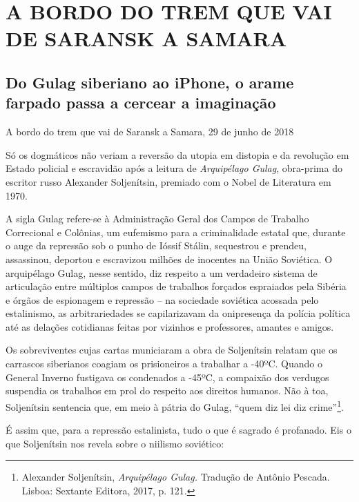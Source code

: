 \newpage
{}
\part*{A BORDO DO TREM QUE VAI DE SARANSK A SAMARA}

\chapter*{Do Gulag siberiano ao iPhone, o arame farpado passa a cercear a imaginação}

\begin{flushright}
A bordo do trem que vai de Saransk a Samara, 29 de junho de 2018
\end{flushright}

Só os dogmáticos não veriam a reversão da utopia em distopia e da
revolução em Estado policial e escravidão após a leitura de
\emph{Arquipélago Gulag}, obra-prima do escritor russo Alexander
Soljenítsin, premiado com o Nobel de Literatura em 1970.

A sigla Gulag refere-se à Administração Geral dos Campos de Trabalho
Correcional e Colônias, um eufemismo para a criminalidade estatal que,
durante o auge da repressão sob o punho de Ióssif Stálin, sequestrou e
prendeu, assassinou, deportou e escravizou milhões de inocentes na União
Soviética. O arquipélago Gulag, nesse sentido, diz respeito a um
verdadeiro sistema de articulação entre múltiplos campos de trabalhos
forçados espraiados pela Sibéria e órgãos de espionagem e repressão --
na sociedade soviética acossada pelo estalinismo, as arbitrariedades se
capilarizavam da onipresença da polícia política até as delações
cotidianas feitas por vizinhos e professores, amantes e amigos.

Os sobreviventes cujas cartas municiaram a obra de Soljenítsin relatam
que os carrascos siberianos coagiam os prisioneiros a trabalhar a -40ºC.
Quando o General Inverno fustigava os condenados a -45ºC, a compaixão
dos verdugos suspendia os trabalhos em prol do respeito aos direitos
humanos. Não à toa, Soljenítsin sentencia que, em meio à pátria do
Gulag, ``quem diz lei diz crime''\footnote{Alexander Soljenítsin,
  \emph{Arquipélago Gulag.} Tradução de Antônio Pescada. Lisboa:
  Sextante Editora, 2017, p. 121.}.

É assim que, para a repressão estalinista, tudo o que é sagrado é
profanado. Eis o que Soljenítsin nos revela sobre o niilismo soviético:

